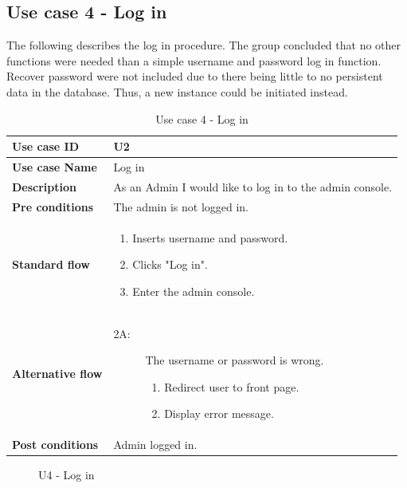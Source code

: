 \clearpage

\subsection{Use case 4 - Log in}
\label{subsec:requirements_engineering-use_cases-log_in}

The following describes the log in procedure. The group concluded that no other functions were needed than a simple username and password log in function. Recover password were not included due to there being little to no persistent data in the database. Thus, a new instance could be initiated instead.

\begin{table}[ht!]
\centering
\begin{tabular}{|l|p{5cm}|}
\hline
\textbf{Use case ID} & U2 \\ \hline
\textbf{Use case Name} & Log in \\ \hline
\textbf{Description} & As an Admin I would like to log in to the admin console. \\ \hline
\textbf{Pre conditions} & The admin is not logged in. \\ \hline
\textbf{Standard flow} & \begin{enumerate}
\item Inserts username and password.
\item Clicks "Log in".
\item Enter the admin console. 
\end{enumerate} \\ \hline
\textbf{Alternative flow} & \begin{description}
\item[2A:] The username or password is wrong. \begin{enumerate}
\item Redirect user to front page.
\item Display error message.
\end{enumerate}
\end{description} \\ \hline
\textbf{Post conditions} & Admin logged in. \\ \hline
\end{tabular}
\caption{Use case 4 - Log in}
\label{uc4}
\end{table}

\begin{center}
  \begin{figure}[ht!]
    \caption{U4 - Log in}
    \label{fig:u4}
  \end{figure}
\end{center}

